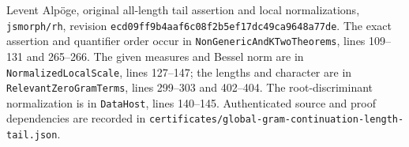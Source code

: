 Levent Alp\"oge, original all-length tail assertion and local
normalizations, \texttt{jsmorph/rh}, revision
\texttt{ecd09ff9b4aaf6c08f2b5ef17dc49ca9648a77de}.
The exact assertion and quantifier order occur in
\texttt{NonGenericAndKTwoTheorems}, lines 109--131 and 265--266.
The given measures and Bessel norm are in
\texttt{NormalizedLocalScale}, lines 127--147;
the lengths and character are in \texttt{RelevantZeroGramTerms},
lines 299--303 and 402--404.  The root-discriminant normalization
is in \texttt{DataHost}, lines 140--145.
Authenticated source and proof dependencies are recorded in
\texttt{certificates/global-gram-continuation-length-tail.json}.
